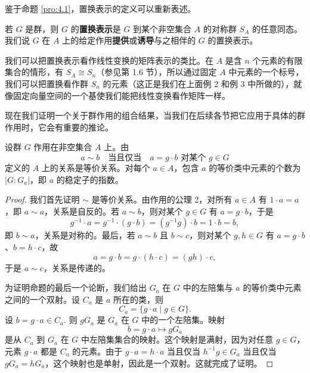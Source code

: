 鉴于命题 \ref{pro:4.1}，置换表示的定义可以重新表述。

\begin{definition}
若 \(G\) 是群，则 \(G\) 的\textbf{置换表示}是 \(G\) 到某个非空集合 \(A\) 的对称群 \(S_A\) 的任意同态。我们说 \(G\) 在 \(A\) 上的给定作用\textbf{提供}或\textbf{诱导}与之相伴的 \(G\) 的置换表示。
\end{definition}

我们可以把置换表示看作线性变换的矩阵表示的类比。在 \(A\) 是含 \(n\) 个元素的有限集合的情形，有 \(S_A \cong S_n\)（参见第 1.6 节），所以通过固定 \(A\) 中元素的一个标号，我们可以把置换看作群 \(S_n\) 的元素（这正是我们在上面例 2 和例 3 中所做的），就像固定向量空间的一个基使我们能把线性变换看作矩阵一样。

现在我们证明一个关于群作用的组合结果，当我们在后续各节把它应用于具体的群作用时，它会有重要的推论。

\begin{proposition}\label{pro:4.2}
设群 \(G\) 作用在非空集合 \(A\) 上。由
\[
a \sim b \quad \text{当且仅当} \quad a = g \cdot b \text{ 对某个 } g \in G
\]
定义的 \(A\) 上的关系是等价关系。对每个 \(a \in A\)，包含 \(a\) 的等价类中元素的个数为 \(|G : G_a|\)，即 \(a\) 的稳定子的指数。
\end{proposition}

\begin{proof}
我们首先证明 \(\sim\) 是等价关系。由作用的公理 2，对所有 \(a \in A\) 有 \(1 \cdot a = a\)，即 \(a \sim a\)，关系是自反的。若 \(a \sim b\)，则对某个 \(g \in G\) 有 \(a = g \cdot b\)，于是
\[
g^{-1} \cdot a = g^{-1} \cdot (g \cdot b) = (g^{-1}g) \cdot b = 1 \cdot b = b,
\]
即 \(b \sim a\)，关系是对称的。最后，若 \(a \sim b\) 且 \(b \sim c\)，则对某个 \(g, h \in G\) 有 \(a = g \cdot b\)、\(b = h \cdot c\)，故
\[
a = g \cdot b = g \cdot (h \cdot c) = (gh) \cdot c,
\]
于是 \(a \sim c\)，关系是传递的。

为证明命题的最后一个论断，我们给出 \(G_a\) 在 \(G\) 中的左陪集与 \(a\) 的等价类中元素之间的一个双射。设 \(C_a\) 是 \(a\) 所在的类，则
\[
C_a = \{g \cdot a \mid g \in G\}.
\]
设 \(b = g \cdot a \in C_a\). 则 \(gG_a\) 是 \(G_a\) 在 \(G\) 中的一个左陪集。映射
\[
b = g \cdot a \longmapsto gG_a
\]
是从 \(C_a\) 到 \(G_a\) 在 \(G\) 中左陪集集合的映射。这个映射是满射，因为对任意 \(g \in G\)，元素 \(g \cdot a\) 都是 \(C_a\) 的元素。由于 \(g \cdot a = h \cdot a\) 当且仅当 \(h^{-1}g \in G_a\) 当且仅当 \(gG_a = hG_a\)，这个映射也是单射，因此是一个双射。这就完成了证明。
\end{proof}

